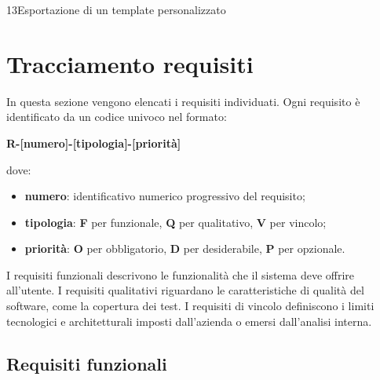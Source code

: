 \begin{usecase}{13}{Esportazione di un template personalizzato}
\label{uc:13}
\end{usecase}

\section{Tracciamento requisiti}

In questa sezione vengono elencati i requisiti individuati. Ogni requisito è identificato da un codice univoco nel formato:
\begin{center}
    \textbf{R-[numero]-[tipologia]-[priorità]}
\end{center}
dove:
\begin{itemize}
    \item \textbf{numero}: identificativo numerico progressivo del requisito;
    \item \textbf{tipologia}: \textbf{F} per funzionale, \textbf{Q} per qualitativo, \textbf{V} per vincolo;
    \item \textbf{priorità}: \textbf{O} per obbligatorio, \textbf{D} per desiderabile, \textbf{P} per opzionale.
\end{itemize}
I requisiti funzionali descrivono le funzionalità che il sistema deve offrire all'utente. I requisiti qualitativi riguardano le caratteristiche di qualità del software, come la copertura dei test. I requisiti di vincolo definiscono i limiti tecnologici e architetturali imposti dall'azienda o emersi dall'analisi interna.

\subsection{Requisiti funzionali}
\begingroup
\setlength{\LTleft}{-20cm plus 1fill}
\setlength{\LTright}{-20cm plus 1fill}

